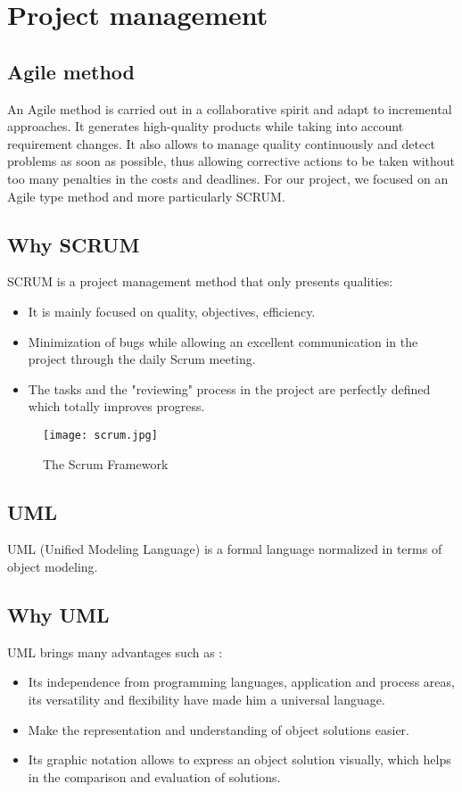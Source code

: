 \section{Project management}

\subsection{Agile method}
An Agile method is carried out in a collaborative spirit and adapt to incremental approaches. It generates high-quality products while taking into account requirement changes. It also allows
to manage quality continuously and detect problems as soon as possible,
thus allowing corrective actions to be taken without too many penalties in the
costs and deadlines. For our project, we focused on an
Agile type method and more particularly SCRUM\cite{cite0}.

\subsection{Why SCRUM}
SCRUM is a project management method that only presents qualities: 

\begin{itemize}
  \item It is mainly focused on quality, objectives, efficiency.
  \item Minimization of bugs while allowing an excellent communication in the project through the daily Scrum meeting.
  \item The tasks and the "reviewing" process in the project are perfectly defined which totally improves progress.
\end{itemize}


\vfill
\clearpage

\begin{figure}[!ht]
    \centering
    \texttt{[image: scrum.jpg]}
    \caption{The Scrum Framework}
    \label{fig:scrum}
\end{figure}



\subsection{UML\cite{cite1}}

UML (Unified Modeling Language) is a formal language normalized in terms of
object modeling.

\subsection{Why UML}
UML brings many advantages such as :
\begin{itemize}
  \item Its independence from programming languages, application and process areas, its versatility and flexibility have made him a universal language.
  \item Make the representation and understanding of object solutions easier.
  \item Its graphic notation allows to express an object solution visually, which helps in the comparison and evaluation of solutions.
\end{itemize}

